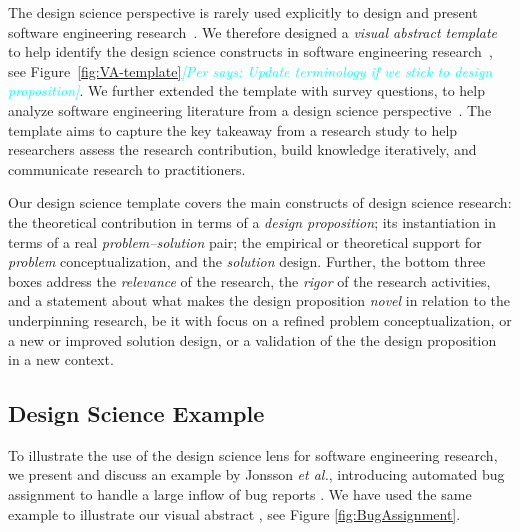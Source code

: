 \documentclass[graybox]{svmult}
\newcommand{\per}[1]{\textcolor{cyan}{{\it [Per says: #1]}}}
\newcommand{\per}[1]{}
\begin{document}
The design science perspective is rarely used explicitly to design and present software engineering research~\cite{Engstrom19arxiv}. We therefore designed a \emph{visual abstract template} to help identify the design science constructs in software engineering research~\cite{StoreyESEM17}, see Figure~\ref{fig:VA-template}\per{Update terminology if we stick to design proposition}. We further extended the template with survey questions, to help analyze software engineering literature from a design science perspective~\cite{Engstrom19arxiv}. The template aims to capture the key takeaway from a research study to help researchers assess the research contribution, build knowledge iteratively, and communicate research to practitioners. %

Our design science template covers the main constructs of design science research: the theoretical contribution in terms of a \emph{design proposition}; its instantiation in terms of a real \emph{problem--solution} pair;  the empirical or theoretical support for \emph{problem} conceptualization, and the \emph{solution} design. Further, the bottom three boxes address the \emph{relevance} of the research, the \emph{rigor} of the research activities,  and a statement about what makes the design proposition \emph{novel} in relation to the underpinning research, be it with focus on a refined problem conceptualization, or a new or improved solution design, or a validation of the the design proposition in a new context. 



\subsection{Design Science Example}
\label{sec:examples}
To illustrate the use of the design science lens for software engineering research, we present and discuss an example by Jonsson \emph{et al.}, introducing automated bug assignment to handle a large inflow of bug reports \cite{JonssonBug15}. We have used the same example to illustrate our visual abstract \cite{StoreyESEM17}, see Figure \ref{fig:BugAssignment}.
\end{document}

